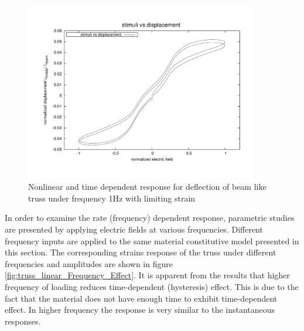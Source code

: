 \begin{figure}  
\centering
\includegraphics[width=4.0in]{./chap_5_active_trusses/images_non_linear_time_dependent_constitutive_equatio/limiting_strain_linear_tetrahedral_time_dependent_efield_vs_displacement_nonlinear.pdf}
\caption{Nonlinear and time dependent response for deflection of beam like truss under frequency 1Hz with limiting strain}
\label{fig:limiting_strain_linear_tetrahedral_time_dependent_efield_vs_displacement_nonlinear}
\end{figure} 

In order to examine the rate (frequency) dependent response, parametric studies are presented by applying electric fields at various frequencies. Different frequency inputs are applied to the same material constitutive model presented in this section. The corresponding strains response of the truss under different frequencies and amplitudes are shown in figure \ref{fig:truss_linear_Frequency_Effect}. It is apparent from the results that higher frequency of loading reduces time-dependent (hysteresis) effect. This is due to the fact that the material does not have enough time to exhibit time-dependent effect. In higher frequency the response is very similar to the instantaneous responses. 


